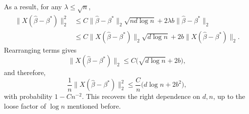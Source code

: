 \documentclass{article}
\begin{document}
	As a result, for any $\lambda \leq \sqrt{n}$,
	\begin{align*}
	\|X(\hat{\beta} - \beta^{\ast})\|_2^2  
	& \leq C \|\hat{\beta} - \beta^{\ast}\|_2 \sqrt{n d \log n} + 2 \lambda b \|\hat{\beta} - \beta^{\ast}\|_2 \\
	& \leq C\|X(\hat{\beta} - \beta^{\ast})\|_2 \sqrt{d \log n} + 2 b \|X(\hat{\beta} - \beta^{\ast})\|_2.
	\end{align*}
	Rearranging terms gives
	\begin{equation*}
		\|X(\hat{\beta} - \beta^{\ast})\|_2 \leq C\Big(\sqrt{d \log n} + 2 b\Big),
	\end{equation*}
	and therefore,
	\begin{equation*}
		\frac{1}{n} \|X(\hat{\beta} - \beta^{\ast})\|_2^2 \leq \frac{C}{n}\Big(d \log n + 2 b^2\Big),
	\end{equation*}
	with probability $1 - C n^{-2}$. This recovers the right dependence on $d,n$, up to the loose factor of $\log n$ mentioned before. 
\end{document}
